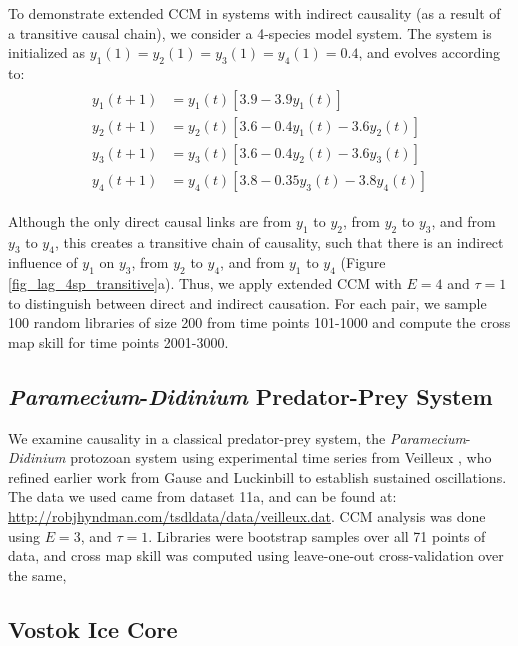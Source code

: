 To demonstrate extended CCM in systems with indirect causality (as a result of a transitive causal chain), we consider a 4-species model system. The system is initialized as $y_1(1) = y_2(1) = y_3(1) = y_4(1) = 0.4$, and evolves according to:
\begin{align}
\label{eqn_4sp_transitive}
\begin{split}
y_1(t+1) &= y_1(t) \left[3.9 - 3.9 y_1(t)\right]\\
y_2(t+1) &= y_2(t) \left[3.6 - 0.4 y_1(t) - 3.6 y_2(t)\right]\\
y_3(t+1) &= y_3(t) \left[3.6 - 0.4 y_2(t) - 3.6 y_3(t)\right]\\
y_4(t+1) &= y_4(t) \left[3.8 - 0.35 y_3(t) - 3.8 y_4(t)\right]
\end{split}
\end{align}

Although the only direct causal links are from $y_1$ to $y_2$, from $y_2$ to $y_3$, and from $y_3$ to $y_4$, this creates a transitive chain of causality, such that there is an indirect influence of $y_1$ on $y_3$, from $y_2$ to $y_4$, and from $y_1$ to $y_4$ (Figure \ref{fig_lag_4sp_transitive}a). Thus, we apply extended CCM with $E = 4$ and $\tau = 1$ to distinguish between direct and indirect causation. For each pair, we sample 100 random libraries of size 200 from time points 101-1000 and compute the cross map skill for time points 2001-3000.

\subsection{\emph{Paramecium}-\emph{Didinium} Predator-Prey System}

We examine causality in a classical predator-prey system, the \emph{Paramecium}-\emph{Didinium} protozoan system using experimental time series from Veilleux \cite{Veilleux_1976}, who refined earlier work from Gause \cite{Gause_1935} and Luckinbill \cite{Luckinbill_1973} to establish sustained oscillations. The data we used came from dataset 11a, and can be found at: \url{http://robjhyndman.com/tsdldata/data/veilleux.dat}. CCM analysis was done using $E = 3$, and $\tau = 1$. Libraries were bootstrap samples over all 71 points of data, and cross map skill was computed using leave-one-out cross-validation over the same,

\subsection{Vostok Ice Core}

